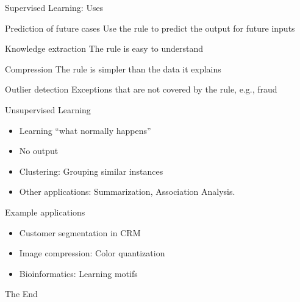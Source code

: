 \documentclass[8pt]{beamer}
\begin{document}
\begin{frame}{Supervised Learning: Uses}
   \begin{block}{Prediction of future cases}
   Use the rule to predict the output for future inputs
   \end{block}
   \begin{block}{Knowledge extraction}
 The rule is easy to understand
   \end{block}
   \begin{block}{Compression}
  The rule is simpler than the data it explains
   \end{block}
   \begin{block}{Outlier detection}
   Exceptions that are not covered by the rule, e.g., fraud
   \end{block}

\end{frame}

\begin{frame}{Unsupervised Learning}
    \begin{itemize}
        \item Learning “what normally happens”
\item No output
\item Clustering: Grouping similar instances
\item Other applications: Summarization, Association Analysis. \end{itemize}
\begin{block}{Example applications}
\begin{itemize}
    \item Customer segmentation in CRM
\item Image compression: Color quantization
\item Bioinformatics: Learning motifs
\end{itemize}
\end{block}
\end{frame}


\begin{frame}
\huge{\centerline{The End}}
\end{frame}
\end{document}
